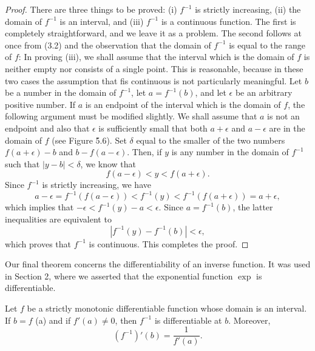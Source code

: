 \begin{proof}
There are three things to be proved: (i) $f^{-1}$ is strictly increasing, (ii) the domain of $f^{-1}$ is an interval, and (iii) $f^{-1}$ is a continuous function. The first is completely straightforward,
and we leave it as a problem. The second follows at once from (3.2) and the observation that the domain of $f^{-1}$ is equal to the range of $f$: In proving (iii), we shall assume that the interval which is the domain of $f$ is neither empty nor consists of a single point. This is reasonable, because in these two cases the assumption that fis continuous is not particularly meaningful. Let $b$ be a number in the domain of $f^{-1}$, let $a = f^{-1}(b)$, and let $\epsilon$ be an arbitrary positive number. If $a$ is an endpoint of the interval which is the domain of $f$, the following argument must be modified slightly. We shall assume that $a$ is not an endpoint and also that $\epsilon$ is sufficiently small that both $a + \epsilon$ and $a - \epsilon$ are in the domain of $f$ (see Figure \f{5.6}). Set $\delta$ equal to the smaller of the two numbers $f(a + \epsilon) - b$ and $b - f(a - \epsilon)$. Then, 
if $y$ is any number in the domain of $f^{-1}$ such that $|y - b| < \delta$, we know that 
$$
f(a - \epsilon) < y < f(a + \epsilon).
$$
Since $f^{-1}$ is strictly increasing, we have
$$
a - \epsilon = f^{-1}(f(a - \epsilon)) < f^{-1}(y) < f^{-1}(f(a + \epsilon)) = a + \epsilon,
$$
which implies that $-\epsilon  < f^{-1}(y) -a < \epsilon$. Since $a = f^{-1}(b)$, the latter inequalities are equivalent to
$$
| f^{-1}(y) - f^{-1}(b)| < \epsilon,
$$
which proves that $f^{-1}$ is continuous. This completes the proof.
\end{proof}

Our final theorem concerns the differentiability of an inverse function. It was used in Section 2, where we asserted that the exponential function $\exp$ is differentiable.
 
\begin{theorem}
\label{thm 5.3.4}
Let $f$ be a strictly monotonic differentiable function whose domain is an interval. If $b = f$ (a) and if $f'(a) \neq 0$, then $f^{-1}$ is differentiable at $b$. Moreover,
$$
(f^{-1})'(b)=  \frac{1}{f'(a)}.
$$
\end{theorem}

